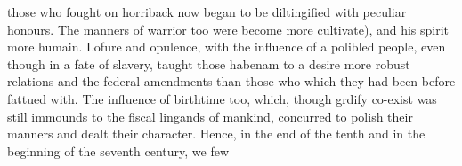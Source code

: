 those who fought on horriback now began to be diltingified with peculiar honours. The manners of warrior too were become more cultivate), and his spirit more humain. Lofure and opulence, with the influence of a polibled people, even though in a fate of slavery, taught those habenam to a desire more robust relations and the federal amendments than those who which they had been before fattued with. The influence of birthtime too, which, though grdify co-exist was still immounds to the fiscal lingands of mankind, concurred to polish their manners and dealt their character. Hence, in the end of the tenth and in the beginning of the seventh century, we few\par\medskip
